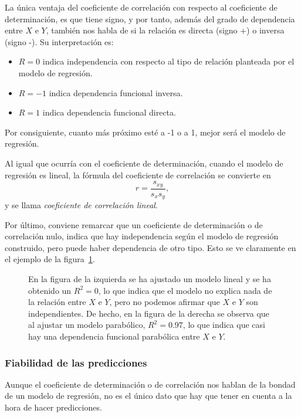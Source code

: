 La única ventaja del coeficiente de correlación con respecto al coeficiente de
determinación, es que tiene signo, y por tanto, además del grado de
dependencia entre $X$ e $Y$, también nos habla de si la relación es directa
(signo +) o inversa (signo -). Su interpretación es:
\begin{itemize}
\item $R=0$ indica independencia con respecto al tipo de relación planteada por el modelo de
regresión.
\item $R=-1$ indica dependencia funcional inversa.
\item $R=1$ indica dependencia funcional directa.
\end{itemize}
Por consiguiente, cuanto más próximo esté a -1 o a 1, mejor será el modelo de
regresión.

Al igual que ocurría con el coeficiente de determinación, cuando el modelo de
regresión es lineal, la fórmula del coeficiente de correlación se convierte en
\[
r=\frac{s_{xy}}{s_x s_y},
\]
y se llama \emph{coeficiente de correlación lineal}.

Por último, conviene remarcar que un coeficiente de determinación o de
correlación nulo, indica que hay independencia según el modelo de regresión
construido, pero puede haber dependencia de otro tipo. Esto se ve claramente en el ejemplo de  la figura~\ref{g:dependenciaparabolica}.

\begin{figure}[h!]
\centering {}\qquad
{}
\caption{En la figura de la izquierda se ha ajustado un modelo lineal y se ha obtenido un
$R^2=0$, lo que indica que el modelo no explica nada de la relación entre $X$ e
$Y$, pero no podemos afirmar que $X$ e $Y$ son independientes. De hecho, en la
figura de la derecha se observa que al ajustar un modelo parabólico, $R^2=0.97$,
lo que indica que casi hay una dependencia funcional parabólica entre $X$ e $Y$.}
\label{g:dependenciaparabolica}
\end{figure}

\subsubsection{Fiabilidad de las predicciones}
Aunque el coeficiente de determinación o de correlación nos hablan de la bondad de un modelo de regresión, no es el único dato que hay que tener en cuenta a la hora de hacer predicciones.

